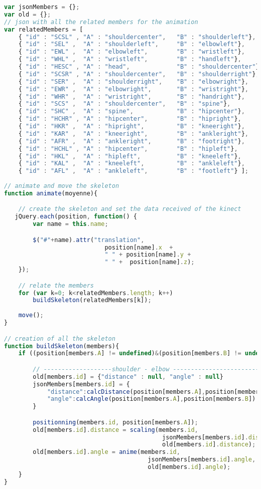 \lstset{style=mystyle}
\begin{lstlisting}[language=JavaScript]
var jsonMembers = {};
var old = {};
// json with all the related members for the animation 
var relatedMembers = [
	{ "id" : "SCSL" , "A" : "shouldercenter",   "B" : "shoulderleft"},
	{ "id" : "SEL" ,  "A" : "shoulderleft",  	"B" : "elbowleft"},
	{ "id" : "EWL" ,  "A" : "elbowleft",  		"B" : "wristleft"},
	{ "id" : "WHL" ,  "A" : "wristleft",  		"B" : "handleft"},
	{ "id" : "HESC" , "A" : "head",  			"B" : "shouldercenter"},
	{ "id" : "SCSR" , "A" : "shouldercenter",   "B" : "shoulderright"},
	{ "id" : "SER" ,  "A" : "shoulderright",    "B" : "elbowright"},
	{ "id" : "EWR" ,  "A" : "elbowright",  		"B" : "wristright"},
	{ "id" : "WHR" ,  "A" : "wristright",  		"B" : "handright"},
	{ "id" : "SCS" ,  "A" : "shouldercenter",  	"B" : "spine"},
	{ "id" : "SHC" ,  "A" : "spine",  			"B" : "hipcenter"},
	{ "id" : "HCHR" , "A" : "hipcenter",  		"B" : "hipright"},
	{ "id" : "HKR" ,  "A" : "hipright",  		"B" : "kneeright"},
	{ "id" : "KAR" ,  "A" : "kneeright",  		"B" : "ankleright"},
	{ "id" : "AFR" ,  "A" : "ankleright",  		"B" : "footright"},
	{ "id" : "HCHL" , "A" : "hipcenter",  		"B" : "hipleft"},
	{ "id" : "HKL" ,  "A" : "hipleft", 			"B" : "kneeleft"},
	{ "id" : "KAL" ,  "A" : "kneeleft",  		"B" : "ankleleft"},
	{ "id" : "AFL" ,  "A" : "ankleleft",  		"B" : "footleft"} ];	
	
// animate and move the skeleton 
function animate(moyenne){

	// create the skeleton and set the data received of the kinect
   jQuery.each(position, function() {
		var name = this.name;

		$("#"+name).attr("translation",  
							position[name].x  + 
							" " + position[name].y + 
							" " +  position[name].z);
	});

	// relate the members
	for (var k=0; k<relatedMembers.length; k++)
		buildSkeleton(relatedMembers[k]);
	
	move();
}

// creation of all the skeleton
function buildSkeleton(members){
	if ((position[members.A] != undefined)&(position[members.B] != undefined)){

		// -------------------shoulder - elbow --------------------------------
		old[members.id] = {"distance" : null, "angle" : null}
		jsonMembers[members.id] = {
			"distance":calcDistance(position[members.A],position[members.B]),
			"angle":calcAngle(position[members.A],position[members.B])
		}

		positionning(members.id, position[members.A]); 
		old[members.id].distance = scaling(members.id, 
											jsonMembers[members.id].distance,
											old[members.id].distance); 
		old[members.id].angle = anime(members.id, 
										jsonMembers[members.id].angle,
										old[members.id].angle);
	}
}


\end{lstlisting}
